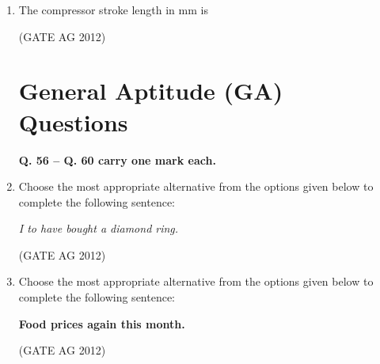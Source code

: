 \documentclass[journal]{IEEEtran}
\begin{document}
\begin{enumerate}
\medskip

\item
 The compressor stroke length in mm is
\begin{enumerate}
\end{enumerate}
\hfill(GATE AG 2012)\\

\medskip

\section*{General Aptitude (GA) Questions}

\textbf{Q. 56 -- Q. 60 carry one mark each.}

 \item
 Choose the most appropriate alternative from the options given below to complete the following sentence:

\textit{I \underline{\hspace{1cm}} to have bought a diamond ring.}

\begin{enumerate}
\end{enumerate}
\hfill(GATE AG 2012)\\

\medskip

\item
 Choose the most appropriate alternative from the options given below to complete the following sentence:

\textbf{Food prices \underline{\hspace{2cm}} again this month.}

\begin{enumerate}
\end{enumerate}
\hfill(GATE AG 2012)\\


\end{enumerate}
\end{document}
